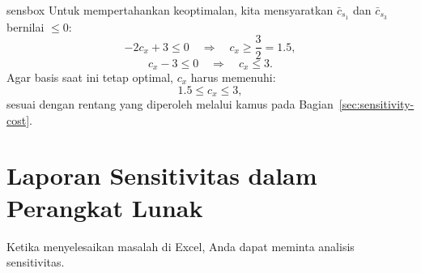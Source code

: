 \begin{steppanel}{sensbox}
Untuk mempertahankan keoptimalan, kita mensyaratkan $\bar{c}_{s_1}$ dan $\bar{c}_{s_3}$ bernilai $\leq 0$:
\[
    -2c_x + 3 \leq 0 \quad \Rightarrow \quad c_x \geq \frac{3}{2} = 1.5,
\]
\[
    c_x - 3 \leq 0 \quad \Rightarrow \quad c_x \leq 3.
\]
Agar basis saat ini tetap optimal, \( c_x \) harus memenuhi:
\[
    \boxed{1.5 \leq c_x \leq 3},
\]
sesuai dengan rentang yang diperoleh melalui kamus pada Bagian~\ref{sec:sensitivity-cost}.
\end{steppanel}

\begin{center}
\par{}\label{fig:sensitivity-objective}%

\end{center}

\section{Laporan Sensitivitas dalam Perangkat Lunak}
\label{sec:sensitivity-software}

Ketika menyelesaikan masalah di Excel, Anda dapat meminta analisis sensitivitas.

